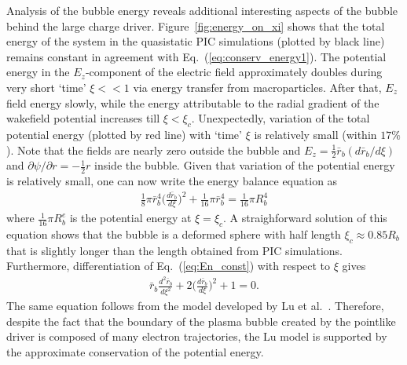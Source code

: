 \documentclass[twocolumn,showpacs,aip]{revtex4}
\begin{document}
Analysis of the bubble energy reveals additional interesting aspects of  the bubble behind the large charge driver.   Figure~\ref{fig:energy_on_xi} shows that  the total energy of the system  in the quasistatic PIC  simulations (plotted by black line) remains constant in agreement with Eq.~(\ref{eq:conserv_energy1}). 
%
The potential energy  in the $E_z$-component of the electric field approximately doubles during very short `time' $\xi<<1$ via energy transfer from  macroparticles. After that, $E_z$ field energy slowly, while the energy attributable to  the radial gradient of the wakefield potential increases  till $\xi<\xi_c$. 
Unexpectedly,   variation of 
the total potential energy (plotted by red line) with `time' $\xi$ 
is  relatively small (within $17\%$). 
Note that the fields are nearly  zero outside the bubble and   $E_z=\frac{1}{2}\bar{r}_b (d\bar{r}_b/d\xi)$ and $\partial \psi/\partial r=-\frac{1}{2}r$  inside the bubble.  Given that   variation of the potential energy  is relatively small, one can now write the energy balance equation as
 \begin{eqnarray}
\frac{1}{8}\pi \bar{r}_b^4 \Big(\frac{d\bar{r}_b}{d\xi}\Big)^2+\frac{1}{16}\pi\bar{r}_b^4  =\frac{1}{16}\pi R_b^4
\label{eq:En_const}
\end{eqnarray}
where $\frac{1}{16}\pi R_b^e$ is the potential energy at  $\xi=\xi_c$. 
A straighforward solution of this equation shows that the bubble  is a deformed sphere
with half length $\xi_c\approx 0.85 R_b$ that is slightly longer than the length obtained from PIC simulations.  Furthermore, differentiation of Eq.~(\ref{eq:En_const}) with respect  to $\xi$ gives 
\begin{eqnarray}
\bar{r}_b \frac{d^2\bar{r}_b}{d\xi^2}+2\Big(\frac{d\bar{r}_b}{d\xi}\Big)^2+1=0.
\label{eq:Lu}
\end{eqnarray}
The same equation follows from the
  model developed by Lu et al.~\cite{Lu_theory_2006}. Therefore, despite the fact that the  boundary of the plasma bubble created by the pointlike  driver is composed of many electron trajectories, the Lu model is supported by the approximate conservation  of the  potential energy.  
\end{document}
